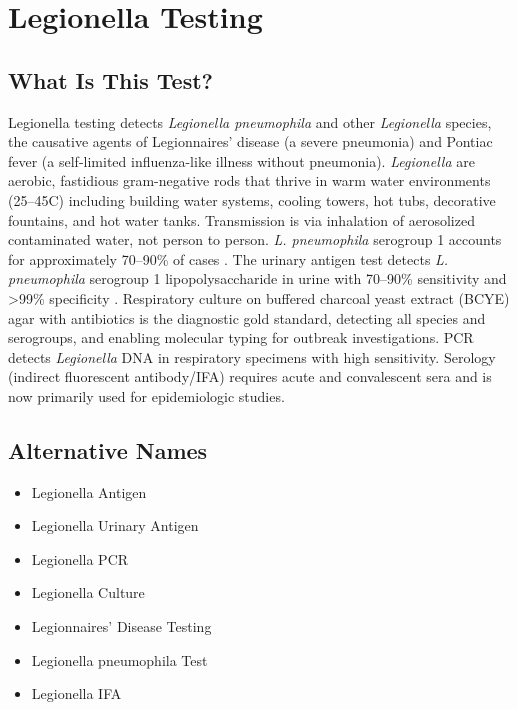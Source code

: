 \chapter{Legionella Testing}

\section*{What Is This Test?}
Legionella testing detects \textit{Legionella pneumophila} and other \textit{Legionella} species, the causative agents of Legionnaires' disease (a severe pneumonia) and Pontiac fever (a self-limited influenza-like illness without pneumonia). \textit{Legionella} are aerobic, fastidious gram-negative rods that thrive in warm water environments (25--45\textdegree{}C) including building water systems, cooling towers, hot tubs, decorative fountains, and hot water tanks. Transmission is via inhalation of aerosolized contaminated water, not person to person. \textit{L. pneumophila} serogroup 1 accounts for approximately 70--90\% of cases \cite{cunha2016legionnaires}. The urinary antigen test detects \textit{L. pneumophila} serogroup 1 lipopolysaccharide in urine with 70--90\% sensitivity and >99\% specificity \cite{shimada2009systematic}. Respiratory culture on buffered charcoal yeast extract (BCYE) agar with antibiotics is the diagnostic gold standard, detecting all species and serogroups, and enabling molecular typing for outbreak investigations. PCR detects \textit{Legionella} DNA in respiratory specimens with high sensitivity. Serology (indirect fluorescent antibody/IFA) requires acute and convalescent sera and is now primarily used for epidemiologic studies.

\section*{Alternative Names}
\begin{itemize}
  \item Legionella Antigen
  \item Legionella Urinary Antigen
  \item Legionella PCR
  \item Legionella Culture
  \item Legionnaires' Disease Testing
  \item Legionella pneumophila Test
  \item Legionella IFA
\end{itemize}
